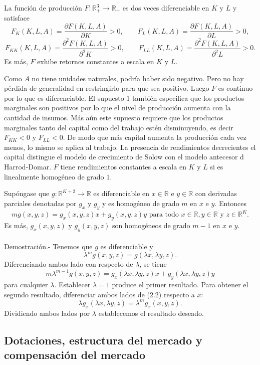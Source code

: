 \begin{supuesto} La función de producción $F:\mathbb{R}_+^3\to \mathbb{R}_+$ es dos veces diferenciable en $K$ y $L$ y satisface
    $$F_K(K,L,A) = \dfrac{\partial F(K,L,A)}{\partial K}>0,\qquad F_L(K,L,A) = \dfrac{\partial F(K,L,A)}{\partial L}>0,$$
    $$F_{KK}(K,L,A) = \dfrac{\partial^2 F(K,L,A)}{\partial^2 K}>0,\qquad F_{LL}(K,L,A) = \dfrac{\partial^2 F(K,L,A)}{\partial^2 L}>0.$$
    Es más, $F$ exhibe retornos constantes a escala en $K$ y $L$.
\end{supuesto}
Como $A$ no tiene unidades naturales, podría haber sido negativo. Pero no hay pérdida de generalidad en restringirlo para que sea positivo. Luego $F$ es continuo por lo que es diferenciable. El supuesto 1 también especifica que los productos marginales son positivos por lo que el nivel de producción aumenta con la cantidad de insumos. Más aún este supuesto requiere que los productos marginales tanto del capital como del trabajo estén disminuyendo, es decir $F_{KK}<0$ y $F_{LL}<0$. De modo que más capital aumenta la producción cada vez menos, lo mismo se aplica al trabajo. La presencia de rendimientos decrecientes el capital distingue el modelo de crecimiento de Solow con el modelo antecesor d Harrod-Domar. $F$ tiene rendimientos constantes a escala en $K$ y $L$ si es linealmente homogéneo de grado $1$.

\begin{teo}
    Supóngase que $g:\mathbb{R}^{K+2}\to \mathbb{R}$ es diferenciable en $x\in \mathbb{R}$ e $y\in \mathbb{R}$ con derivadas parciales denotadas por $g_x$ y $g_y$ y es homogéneo de grado $m$ en $x$ e $y$. Entonces 
    $$mg(x,y,z)=g_x(x,y,z)x+g_y(x,y,z)y\mbox{ para todo } x\in \mathbb{R},y\in \mathbb{R} \mbox{ y }z\in \mathbb{R}^K.$$
    Es más, $g_x(x,y,z)$ y $g_y(x,y,z)$ son homogéneos de grado $m-1$ en $x$ e $y$.\\\\
	Demostración.-\; Tenemos que $g$ es diferenciable y
	\begin{equation}
	\lambda^mg(x,y,z)=g(\lambda x,\lambda y, z).
	\end{equation}
	Diferenciando ambos lado con respecto de $\lambda$, se tiene
	$$m\lambda^{m-1}g(x,y,z)=g_x(\lambda x,\lambda y,z)x+g_y(\lambda x , \lambda y , z)y$$
	para cualquier $\lambda$. Establecer $\lambda=1$ produce el primer resultado. Para obtener el segundo resultado, diferenciar ambos lados de (2.2) respecto a $x$:
	$$\lambda g_x(\lambda x , \lambda y,z)=\lambda^m g_x(x,y,z).$$
	Dividiendo ambos lados por $\lambda$ establecemos el resultado deseado.
\end{teo}

\subsection{Dotaciones, estructura del mercado y compensación del mercado}
